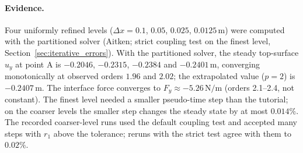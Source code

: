 \paragraph{Evidence.}
Four uniformly refined levels ($\Delta x = 0.1$, $0.05$, $0.025$, $0.0125\,\mathrm{m}$) were computed with the partitioned solver (Aitken; strict coupling test on the finest level, Section~\ref{sec:iterative_errors}).
With the partitioned solver, the steady top-surface $u_y$ at point A is $-0.2046$, $-0.2315$, $-0.2384$ and $-0.2401\,\mathrm{m}$, converging monotonically at observed orders $1.96$ and $2.02$; the extrapolated value ($p = 2$) is $-0.2407\,\mathrm{m}$. The interface force converges to $F_y \approx -5.26\,\mathrm{N/m}$ (orders 2.1--2.4, not constant).
The finest level needed a smaller pseudo-time step than the tutorial; on the coarser levels the smaller step changes the steady state by at most $0.014\%$. The recorded coarser-level runs used the default coupling test and accepted many steps with $r_1$ above the tolerance; reruns with the strict test agree with them to $0.02\%$.

